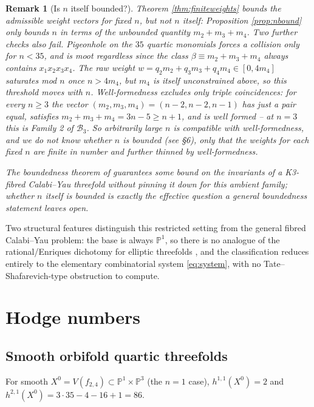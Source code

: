 \documentclass[11pt]{article}
\newtheorem{remark}[theorem]{Remark}
\newcommand{\PP}{\mathbb{P}}
\begin{document}
	\begin{remark}[Is $n$ itself bounded?]\label{rem:noglobalbound}
		Theorem \ref{thm:finiteweights} bounds the admissible weight vectors for fixed $n$, but not $n$ itself: Proposition \ref{prop:nbound} only bounds $n$ in terms of the unbounded quantity $m_2+m_3+m_4$. Two further checks also fail. Pigeonhole on the $35$ quartic monomials forces a collision only for $n<35$, and is moot regardless since the class $\beta\equiv m_2+m_3+m_4$ always contains $x_1x_2x_3x_4$. The raw weight $w=q_2m_2+q_3m_3+q_4m_4\in[0,4m_4]$ saturates mod $n$ once $n>4m_4$, but $m_4$ is itself unconstrained above, so this threshold moves with $n$. Well-formedness excludes only \emph{triple} coincidences: for every $n\ge3$ the vector $(m_2,m_3,m_4)=(n-2,n-2,n-1)$ has just a pair equal, satisfies $m_2+m_3+m_4=3n-5\ge n+1$, and is well formed -- at $n=3$ this is Family 2 of $\mathcal B_3$. So arbitrarily large $n$ is compatible with well-formedness, and we do not know whether $n$ is bounded (see \S6), only that the weights for each fixed $n$ are finite in number and further thinned by well-formedness.
		
		The boundedness theorem of \cite{EngelFilipazziGreerMauriSvaldi2025} guarantees some bound on the invariants of a K3-fibred Calabi--Yau threefold without pinning it down for this ambient family; whether $n$ itself is bounded is exactly the effective question a general boundedness statement leaves open.
	\end{remark}
	
	Two structural features distinguish this restricted setting from the general fibred Calabi--Yau problem: the base is always $\PP^1$, so there is no analogue of the rational/Enriques dichotomy for elliptic threefolds \cite[Prop.\ 2.3]{Gross1994}, and the classification reduces entirely to the elementary combinatorial system \eqref{eq:system}, with no Tate--Shafarevich-type obstruction to compute.
	
	\section{Hodge numbers}
	
	\subsection{Smooth orbifold quartic threefolds}
	
	For smooth $X^0=V(f_{2,4})\subset\PP^1\times\PP^3$ (the $n=1$ case), $h^{1,1}(X^0)=2$ and $h^{2,1}(X^0)=3\cdot35-4-16+1=86$.
	
\end{document}
